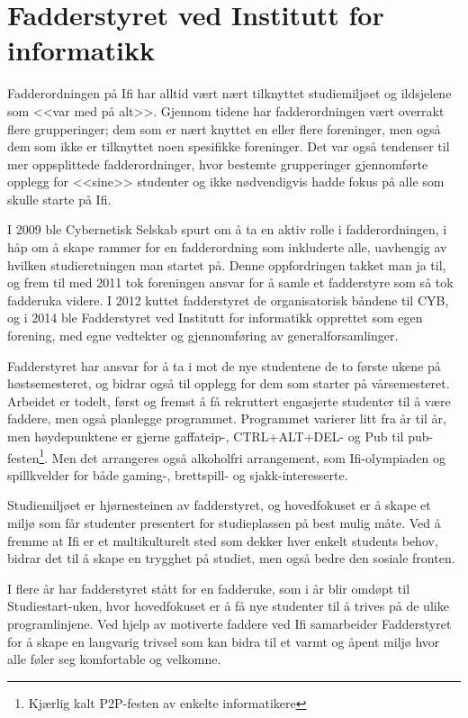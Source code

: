 \chapter{Fadderstyret ved Institutt for informatikk}

\author{Skrevet av Thao Tran, leder for Fadderstyret ved Institutt for informatikk, og Arne Hassel}

Fadderordningen på Ifi har alltid vært nært tilknyttet studiemiljøet og ildsjelene som <<var med på alt>>. Gjennom tidene har fadderordningen vært overrakt flere grupperinger; dem som er nært knyttet en eller flere foreninger, men også dem som ikke er tilknyttet noen spesifikke foreninger. Det var også tendenser til mer oppsplittede fadderordninger, hvor bestemte grupperinger gjennomførte opplegg for <<sine>> studenter og ikke nødvendigvis hadde fokus på alle som skulle starte på Ifi.

I 2009 ble Cybernetisk Selskab spurt om å ta en aktiv rolle i fadderordningen, i håp om å skape rammer for en fadderordning som inkluderte alle, uavhengig av hvilken studieretningen man startet på. Denne oppfordringen takket man ja til, og frem til med 2011 tok foreningen ansvar for å samle et fadderstyre som så tok fadderuka videre. I 2012 kuttet fadderstyret de organisatorisk båndene til CYB, og i 2014 ble Fadderstyret ved Institutt for informatikk opprettet som egen forening, med egne vedtekter og gjennomføring av generalforsamlinger.

Fadderstyret har ansvar for å ta i mot de nye studentene de to første ukene på høstsemesteret, og bidrar også til opplegg for dem som starter på vårsemesteret. Arbeidet er todelt, først og fremst å få rekruttert engasjerte studenter til å være faddere, men også planlegge programmet. Programmet varierer litt fra år til år, men høydepunktene er gjerne gaffateip-, CTRL+ALT+DEL- og Pub til pub-festen\footnote{Kjærlig kalt P2P-festen av enkelte informatikere}. Men det arrangeres også alkoholfri arrangement, som Ifi-olympiaden og spillkvelder for både gaming-, brettspill- og sjakk-interesserte.

Studiemiljøet er hjørnesteinen av fadderstyret, og hovedfokuset er å skape et miljø som får studenter presentert for studieplassen på best mulig måte. Ved å fremme at Ifi er et multikulturelt sted som dekker hver enkelt students behov, bidrar det til å skape en trygghet på studiet, men også bedre den sosiale fronten.

I flere år har fadderstyret stått for en fadderuke, som i år blir omdøpt til Studiestart-uken, hvor hovedfokuset er å få nye studenter til å trives på de ulike programlinjene. Ved hjelp av motiverte faddere ved Ifi samarbeider Fadderstyret for å skape en langvarig trivsel som kan bidra til et varmt og åpent miljø hvor alle føler seg komfortable og velkomne.
